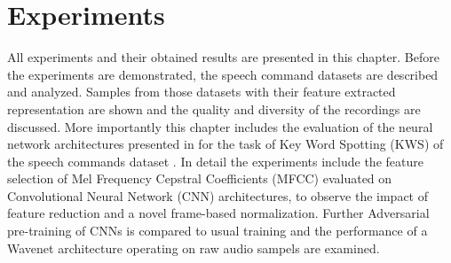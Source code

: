 
\chapter{Experiments}\label{sec:exp}
All experiments and their obtained results are presented in this chapter.
Before the experiments are demonstrated, the speech command datasets are described and analyzed.
Samples from those datasets with their feature extracted representation are shown and the quality and diversity of the recordings are discussed.
More importantly this chapter includes the evaluation of the neural network architectures presented in  for the task of Key Word Spotting (KWS) of the speech commands dataset \cite{Warden2018}.
In detail the experiments include the feature selection of Mel Frequency Cepstral Coefficients (MFCC) evaluated on Convolutional Neural Network (CNN) architectures, to observe the impact of feature reduction and a novel frame-based normalization.
Further Adversarial pre-training of CNNs is compared to usual training and the performance of a Wavenet architecture operating on raw audio sampels are examined.







%


